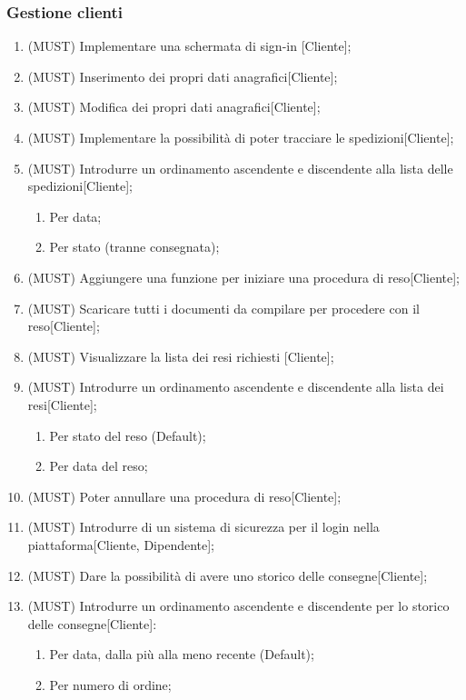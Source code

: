 \subsubsection{Gestione clienti}
\begin{enumerate}
  \item{(MUST)} Implementare una schermata di sign-in [Cliente];
  \item{(MUST)} Inserimento dei propri dati anagrafici[Cliente];
  \item{(MUST)} Modifica dei propri dati anagrafici[Cliente];
  \item{(MUST)} Implementare la possibilità di poter tracciare le spedizioni[Cliente];
  \item{(MUST)} Introdurre un ordinamento ascendente e discendente alla lista delle spedizioni[Cliente];
  \begin{enumerate}
  		\item Per data;
  		\item Per stato (tranne consegnata);
  \end{enumerate}
  \item{(MUST)} Aggiungere una funzione per iniziare una procedura di reso[Cliente];
  \item{(MUST)} Scaricare tutti i documenti da compilare per procedere con il reso[Cliente];
  \item{(MUST)} Visualizzare la lista dei resi richiesti [Cliente];
  \item{(MUST)} Introdurre un ordinamento ascendente e discendente alla lista dei resi[Cliente];
  \begin{enumerate}
  	\item Per stato del reso (Default);
  	\item Per data del reso;
  \end{enumerate}
  \item{(MUST)} Poter annullare una procedura di reso[Cliente];
  \item{(MUST)} Introdurre di un sistema di sicurezza per il login nella piattaforma[Cliente, Dipendente];
  \item{(MUST)} Dare la possibilità di avere uno storico delle consegne[Cliente];
  \item{(MUST)} Introdurre un ordinamento ascendente e discendente per lo storico delle consegne[Cliente]:
    \begin{enumerate}
      \item Per data, dalla più alla meno recente (Default);
      \item Per numero di ordine;

\end{enumerate}
\end{enumerate}
